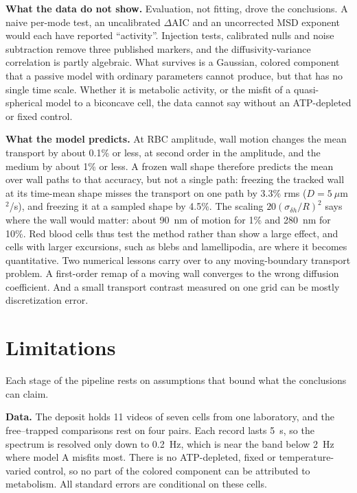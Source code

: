\documentclass[conference]{IEEEtran}
\begin{document}
\textbf{What the data do not show.} Evaluation, not fitting, drove the conclusions. A naive per-mode
test, an uncalibrated $\Delta$AIC and an uncorrected MSD exponent would each have reported
``activity''. Injection tests, calibrated nulls and noise subtraction remove three published
markers, and the diffusivity-variance correlation is partly algebraic. What survives is a Gaussian,
colored component that a passive model with ordinary parameters cannot produce, but that has no
single time scale. Whether it is metabolic activity, or the misfit of a quasi-spherical model to a
biconcave cell, the data cannot say without an ATP-depleted or fixed control.

\textbf{What the model predicts.} At RBC amplitude, wall motion changes the mean transport by about
0.1\% or less, at second order in the amplitude, and the medium by about 1\% or less. A frozen wall
shape therefore predicts the mean over wall paths to that accuracy, but not a single path: freezing
the tracked wall at its time-mean shape misses the transport on one path by 3.3\% rms ($D =
5~\mu$m$^2$/s), and freezing it at a sampled shape by 4.5\%. The scaling $20(\sigma_{\delta h}/R)^2$ says where
the wall would matter: about 90~nm of motion for 1\% and 280~nm for 10\%. Red blood cells thus test
the method rather than show a large effect, and cells with larger excursions, such as blebs and
lamellipodia, are where it becomes quantitative. Two numerical lessons carry over to any
moving-boundary transport problem. A first-order remap of a moving wall converges to the wrong
diffusion coefficient. And a small transport contrast measured on one grid can be mostly
discretization error.

\section{Limitations}\label{sec:limits}

Each stage of the pipeline rests on assumptions that bound what the conclusions can claim.

\textbf{Data.} The deposit holds 11 videos of seven cells from one laboratory, and the free--trapped
comparisons rest on four pairs. Each record lasts 5~s, so the spectrum is resolved only down to
0.2~Hz, which is near the band below 2~Hz where model A misfits most. There is no ATP-depleted,
fixed or temperature-varied control, so no part of the colored component can be attributed to
metabolism. All standard errors are conditional on these cells.
\end{document}
